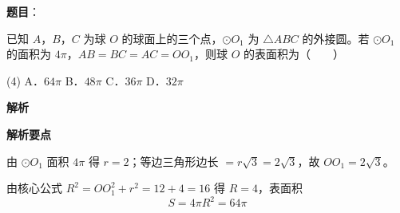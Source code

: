 \begin{answer}

\textbf{题目}：

已知 $A$，$B$，$C$ 为球 $O$ 的球面上的三个点，$\odot O_1$ 为 $\triangle ABC$ 的外接圆。若 $\odot O_1$ 的面积为 $4\pi$，$AB=BC=AC=OO_1$，则球 $O$ 的表面积为\mbox{（　　）}

\begin{gkopts}(4)
\task A．$64\pi$
\task B．$48\pi$
\task C．$36\pi$
\task D．$32\pi$
\end{gkopts}

\textbf{解析}

\textbf{解析要点}

由 $\odot O_1$ 面积 $4\pi$ 得 $r=2$；等边三角形边长 $=r\sqrt3=2\sqrt3$，故 $OO_1=2\sqrt3$。

由核心公式 $R^{2}=OO_1^{2}+r^{2}=12+4=16$ 得 $R=4$，表面积
\nopagebreak[4]
\[S=4\pi R^{2}=64\pi\]


\par\medskip

\end{answer}

